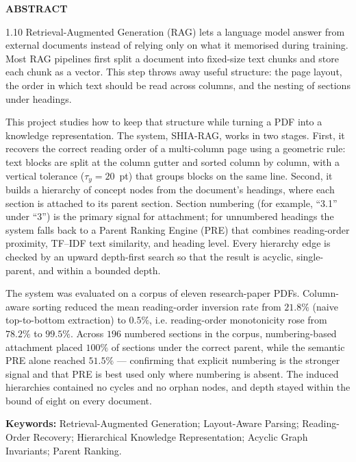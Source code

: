 \documentclass[12pt,a4paper,twoside,openright]{report}
\makeatletter
\def\cleardoublepage{\clearpage\if@twoside
  \ifodd\c@page\else
    \hbox{}\thispagestyle{empty}\newpage
    \if@twocolumn\hbox{}\newpage\fi
  \fi\fi}
\makeatother
\begin{document}
\setcounter{page}{1}
\begin{center}{\Large\bfseries ABSTRACT}\end{center}
\vspace{2mm}
\begin{spacing}{1.10}
\noindent
Retrieval-Augmented Generation (RAG) lets a language model answer from external
documents instead of relying only on what it memorised during training. Most RAG
pipelines first split a document into fixed-size text chunks and store each chunk as a
vector. This step throws away useful structure: the page layout, the order in which
text should be read across columns, and the nesting of sections under headings.

This project studies how to keep that structure while turning a PDF into a knowledge
representation. The system, SHIA-RAG, works in two stages. First, it recovers the
correct reading order of a multi-column page using a geometric rule: text blocks are
split at the column gutter and sorted column by column, with a vertical tolerance
($\tau_y = 20$~pt) that groups blocks on the same line. Second, it builds a hierarchy
of concept nodes from the document's headings, where each section is attached to its
parent section. Section numbering (for example, ``3.1'' under ``3'') is the primary
signal for attachment; for unnumbered headings the system falls back to a Parent
Ranking Engine (PRE) that combines reading-order proximity, TF--IDF text similarity,
and heading level. Every hierarchy edge is checked by an upward depth-first search so
that the result is acyclic, single-parent, and within a bounded depth.

The system was evaluated on a corpus of eleven research-paper PDFs. Column-aware
sorting reduced the mean reading-order inversion rate from $21.8\%$ (naive top-to-bottom
extraction) to $0.5\%$, i.e. reading-order monotonicity rose from $78.2\%$ to $99.5\%$.
Across $196$ numbered sections in the corpus, numbering-based attachment placed
$100\%$ of sections under the correct parent, while the semantic PRE alone reached
$51.5\%$ --- confirming that explicit numbering is the stronger signal and that PRE is
best used only where numbering is absent. The induced hierarchies contained no cycles
and no orphan nodes, and depth stayed within the bound of eight on every document.

\vspace{3mm}
\noindent\textbf{Keywords:} Retrieval-Augmented Generation; Layout-Aware Parsing;
Reading-Order Recovery; Hierarchical Knowledge Representation; Acyclic Graph
Invariants; Parent Ranking.
\end{spacing}
\cleardoublepage
\end{document}

